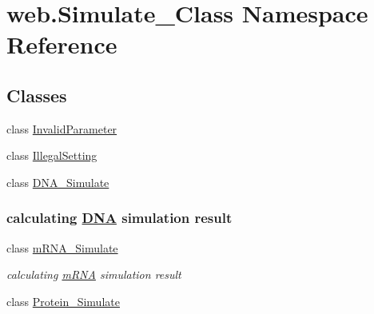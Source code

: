 \hypertarget{namespaceweb_1_1_simulate___class}{\section{web.\-Simulate\-\_\-\-Class Namespace Reference}
\label{namespaceweb_1_1_simulate___class}
}
\subsection*{Classes}
\begin{DoxyCompactItemize}
\item 
class \hyperlink{classweb_1_1_simulate___class_1_1_invalid_parameter}{Invalid\-Parameter}
\item 
class \hyperlink{classweb_1_1_simulate___class_1_1_illegal_setting}{Illegal\-Setting}
\item 
class \hyperlink{classweb_1_1_simulate___class_1_1_d_n_a___simulate}{D\-N\-A\-\_\-\-Simulate}
\begin{DoxyCompactList}\small\item\em \subsubsection*{calculating \hyperlink{class_d_n_a}{D\-N\-A} simulation result }\end{DoxyCompactList}\item 
class \hyperlink{classweb_1_1_simulate___class_1_1m_r_n_a___simulate}{m\-R\-N\-A\-\_\-\-Simulate}
\begin{DoxyCompactList}\small\item\em calculating \hyperlink{classm_r_n_a}{m\-R\-N\-A} simulation result \end{DoxyCompactList}\item 
class \hyperlink{classweb_1_1_simulate___class_1_1_protein___simulate}{Protein\-\_\-\-Simulate}
\end{DoxyCompactItemize}
